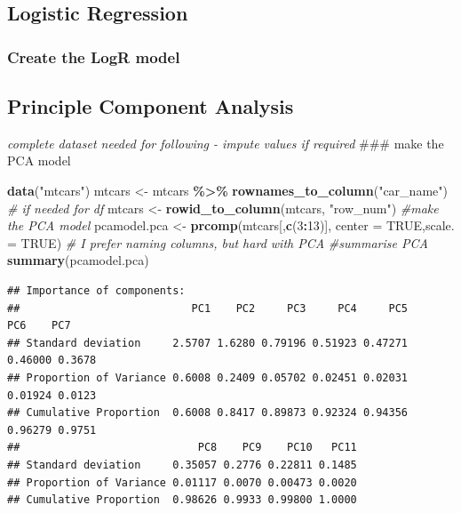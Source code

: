 \documentclass[
]{article}
\newenvironment{Shaded}{\begin{snugshade}}{\end{snugshade}}
\newcommand{\AttributeTok}[1]{\textcolor[rgb]{0.13,0.29,0.53}{#1}}
\newcommand{\CommentTok}[1]{\textcolor[rgb]{0.56,0.35,0.01}{\textit{#1}}}
\newcommand{\ConstantTok}[1]{\textcolor[rgb]{0.56,0.35,0.01}{#1}}
\newcommand{\DecValTok}[1]{\textcolor[rgb]{0.00,0.00,0.81}{#1}}
\newcommand{\FunctionTok}[1]{\textcolor[rgb]{0.13,0.29,0.53}{\textbf{#1}}}
\newcommand{\NormalTok}[1]{#1}
\newcommand{\OtherTok}[1]{\textcolor[rgb]{0.56,0.35,0.01}{#1}}
\newcommand{\SpecialCharTok}[1]{\textcolor[rgb]{0.81,0.36,0.00}{\textbf{#1}}}
\newcommand{\StringTok}[1]{\textcolor[rgb]{0.31,0.60,0.02}{#1}}
\begin{document}
\hypertarget{logistic-regression}{%
\subsection{Logistic Regression}\label{logistic-regression}}

\hypertarget{create-the-logr-model}{%
\subsubsection{Create the LogR model}\label{create-the-logr-model}}

\hypertarget{principle-component-analysis}{%
\subsection{Principle Component Analysis}\label{principle-component-analysis}}

\emph{complete dataset needed for following - impute values if required}
\#\#\# make the PCA model

\begin{Shaded}
\begin{Highlighting}[]
\FunctionTok{data}\NormalTok{(}\StringTok{"mtcars"}\NormalTok{)}
\NormalTok{mtcars }\OtherTok{\textless{}{-}}\NormalTok{ mtcars }\SpecialCharTok{\%\textgreater{}\%} \FunctionTok{rownames\_to\_column}\NormalTok{(}\StringTok{"car\_name"}\NormalTok{) }\CommentTok{\# if needed for df}
\NormalTok{mtcars }\OtherTok{\textless{}{-}} \FunctionTok{rowid\_to\_column}\NormalTok{(mtcars, }\StringTok{"row\_num"}\NormalTok{)}
\CommentTok{\#make the PCA model}
\NormalTok{pcamodel.pca }\OtherTok{\textless{}{-}} \FunctionTok{prcomp}\NormalTok{(mtcars[,}\FunctionTok{c}\NormalTok{(}\DecValTok{3}\SpecialCharTok{:}\DecValTok{13}\NormalTok{)], }\AttributeTok{center =} \ConstantTok{TRUE}\NormalTok{,}\AttributeTok{scale. =} \ConstantTok{TRUE}\NormalTok{) }\CommentTok{\# I prefer naming columns, but hard with PCA}
\CommentTok{\#summarise PCA}
\FunctionTok{summary}\NormalTok{(pcamodel.pca)}
\end{Highlighting}
\end{Shaded}

\begin{verbatim}
## Importance of components:
##                           PC1    PC2     PC3     PC4     PC5     PC6    PC7
## Standard deviation     2.5707 1.6280 0.79196 0.51923 0.47271 0.46000 0.3678
## Proportion of Variance 0.6008 0.2409 0.05702 0.02451 0.02031 0.01924 0.0123
## Cumulative Proportion  0.6008 0.8417 0.89873 0.92324 0.94356 0.96279 0.9751
##                            PC8    PC9    PC10   PC11
## Standard deviation     0.35057 0.2776 0.22811 0.1485
## Proportion of Variance 0.01117 0.0070 0.00473 0.0020
## Cumulative Proportion  0.98626 0.9933 0.99800 1.0000
\end{verbatim}
\end{document}
